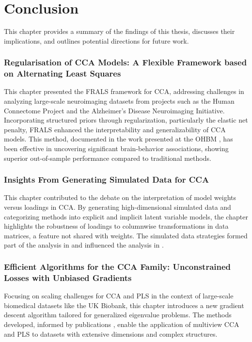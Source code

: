 \chapter{Conclusion}\label{ch:discussion}

This chapter provides a summary of the findings of this thesis, discusses their implications, and outlines potential directions for future work. 

\subsection{Regularisation of CCA Models:
A Flexible Framework based on
Alternating Least Squares}
This chapter presented the FRALS framework for CCA, addressing challenges in analyzing large-scale neuroimaging datasets from projects such as the Human Connectome Project and the Alzheimer's Disease Neuroimaging Initiative. Incorporating structured priors through regularization, particularly the elastic net penalty, FRALS enhanced the interpretability and generalizability of CCA models. This method, documented in the work presented at the OHBM \citep{chapman2023als}, has been effective in uncovering significant brain-behavior associations, showing superior out-of-sample performance compared to traditional methods.

\subsection{Insights From Generating
Simulated Data for CCA}
This chapter contributed to the debate on the interpretation of model weights versus loadings in CCA. By generating high-dimensional simulated data and categorizing methods into explicit and implicit latent variable models, the chapter highlights the robustness of loadings to columnwise transformations in data matrices, a feature not shared with weights. The simulated data strategies formed part of the analysis in \citet{mihalik2022canonical} and influenced the analysis in \citet{ADAMS2024}.

\subsection{Efficient Algorithms for the
CCA Family: Unconstrained
Losses with Unbiased
Gradients}
Focusing on scaling challenges for CCA and PLS in the context of large-scale biomedical datasets like the UK Biobank, this chapter introduces a new gradient descent algorithm tailored for generalized eigenvalue problems. The methods developed, informed by publications \citep{chapman2022generalized, chapman2023efficient, chapman2023cca}, enable the application of multiview CCA and PLS to datasets with extensive dimensions and complex structures.

